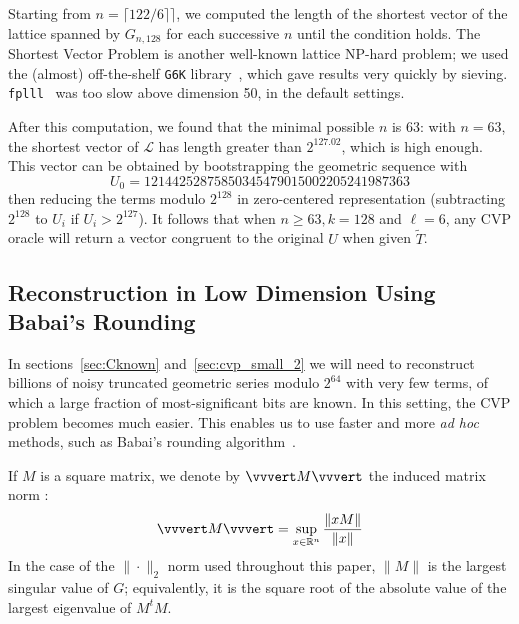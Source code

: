 \documentclass[submission,svgnames,journal=tosc]{iacrtrans}
\begin{document}
Starting from $n=\lceil 122/6\rceil\rceil$, we computed the length of the
shortest vector of the lattice spanned by $G_{n, 128}$ for each successive $n$
until the condition holds. The \textsf{Shortest Vector Problem} is another
well-known lattice NP-hard problem; we used the (almost) off-the-shelf
\texttt{G6K} library~\cite{AlbrechtDHKPS19}, which gave results very quickly by
sieving. \texttt{fplll}~\cite{fplll} was too slow above dimension 50, in the
default settings.

After this computation, we found that the minimal possible $n$ is 63: with
$n=63$, the shortest vector of $\mathcal{L}$ has length greater than
$2^{127.02}$, which is high enough. This vector can be obtained by bootstrapping
the geometric sequence with
\[
  U_0 = 12144252875850345479015002205241987363
\]
then reducing the terms modulo $2^{128}$ in zero-centered representation
(subtracting $2^{128}$ to $U_i$ if $U_i > 2^{127}$). It follows that when
$n\geq 63, k=128$ and $\ell=6$, any CVP oracle will return a vector congruent to
the original $U$ when given $\widetilde{T}$.


\subsection{Reconstruction in Low Dimension Using Babai's Rounding}
\label{sec:cvp_small}

In sections~\ref{sec:Cknown} and~\ref{sec:cvp_small_2} we will need to
reconstruct billions of noisy truncated geometric series modulo $2^{64}$ with
very few terms, of which a large fraction of most-significant bits are known. In
this setting, the CVP problem becomes much easier. This enables us to use faster
and more \textit{ad hoc} methods, such as Babai's rounding
algorithm~\cite{Babai86}.

If $M$ is a square matrix, we denote by $\vvvert M \vvvert$ the induced matrix norm :
\[
  \vvvert M \vvvert =  \sup_{x \in \mathbb{R}^n} \frac{\| xM \|}{\| x \|}
\]
In the case of the $\| \cdot \|_2$ norm used throughout this paper, $\| M \|$ is
the largest singular value of $G$; equivalently, it is the square root of the
absolute value of the largest eigenvalue of $M^{t} M$.
\end{document}
